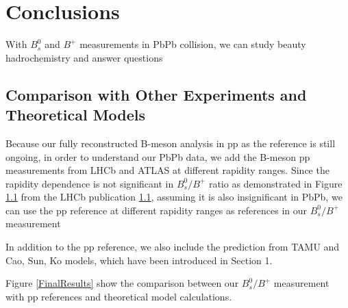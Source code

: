 \chapter{Conclusions}

With $B^0_s$ and $B^+$ measurements in PbPb collision, we can study beauty hadrochemistry and answer questions 

\section{Comparison with Other Experiments and Theoretical Models}

Because our fully reconstructed B-meson analysis in pp as the reference is still ongoing, in order to understand our PbPb data, we add the B-meson pp measurements from LHCb and ATLAS at different rapidity ranges. Since the rapidity dependence is not significant in $B^0_s/B^+$ ratio as demonstrated in Figure \ref{} from the LHCb publication \ref{}, assuming it is also insignificant in PbPb, we can use the pp reference at different rapidity ranges as references in our $B^0_s/B^+$ measurement

In addition to the pp reference, we also include the prediction from TAMU and Cao, Sun, Ko models, which have been introduced in Section 1.

Figure \ref{FinalResults} show the comparison between our $B^0_s/B^+$ measurement with pp references and theoretical model calculations. 

